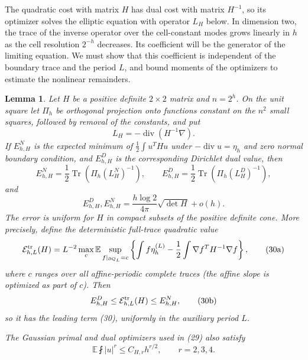 \documentclass[11pt,reqno]{amsart}
\theoremstyle{plain}
\newtheorem{lemma}[theorem]{Lemma}
\theoremstyle{definition}
\theoremstyle{remark}
\numberwithin{equation}{section}
\newcommand{\1}{\mathbf 1}
\begin{document}
The quadratic cost with matrix $H$ has dual cost with matrix $H^{-1}$,
so its optimizer solves the elliptic equation with operator $L_H$ below.
In dimension two, the trace of the inverse operator over the
cell-constant modes grows linearly in $h$ as the cell resolution
$2^{-h}$ decreases.  Its coefficient will be the generator of the
limiting equation.  We must show that this coefficient is independent
of the boundary trace and the period $L$, and bound moments of the
optimizers to estimate the nonlinear remainders.

\begin{lemma}\label{lem:grouped-quadratic-generator}
Let $H$ be a positive definite $2\times2$ matrix and
$n=2^h$.  On the unit square let $\Pi_ h$ be orthogonal projection
onto functions constant on the $n^2$ small squares, followed by
removal of the constants, and put
\begin{equation*}
L_ H=-\operatorname {div}(H^{-1}\nabla).
\end{equation*}
If $E_ {h,H}^N$ is the expected minimum of
$\frac12\int u^THu$ under
$-\operatorname {div}u=\eta_ h$ and zero normal boundary condition,
and $E_ {h,H}^D$ is the corresponding Dirichlet dual value, then
\begin{equation}
E_ {h,H}^N=\frac12\operatorname {Tr}(\Pi_ h(L_ H^N)^{-1}),
\qquad
E_ {h,H}^D=\frac12\operatorname {Tr}(\Pi_ h(L_ H^D)^{-1}),
\tag{29}
\end{equation}
and
\begin{equation}
E_ {h,H}^D,E_ {h,H}^N
=\frac{h\log2}{4\pi}\sqrt{\det H}+o(h).
\tag{30}
\end{equation}
The error is uniform for $H$ in compact subsets of the positive
definite cone.  More precisely, define the deterministic full-trace
quadratic value
\begin{equation}
\mathcal E^{\rm tr}_ {h,L}(H)=L^{-2}\max_ c\mathbb E
\sup_ {f|_ {\partial Q_ L}=c}
\left\{\int f\eta_ h^{(L)}
-\frac12\int\nabla f^TH^{-1}\nabla f\right\},
\tag{30a}
\end{equation}
where $c$ ranges over all affine-periodic complete traces (the affine
slope is optimized as part of $c$).  Then
\begin{equation}
E_ {h,H}^D\leq\mathcal E^{\rm tr}_ {h,L}(H)\leq E_ {h,H}^N,
\tag{30b}
\end{equation}
so it has the leading term (30), uniformly in the auxiliary period
$L$.

The Gaussian primal and dual optimizers used in (29) also satisfy
\begin{equation}
\mathbb E\fint |u|^r\leq C_ {H,r}h^{r/2},\qquad r=2,3,4.
\tag{31}
\end{equation}

\end{lemma}
\end{document}
